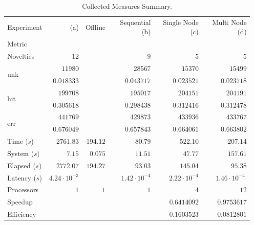 \begin{table}[hbt]
\begin{center}
  \caption{Collected Measures Summary.}
  \label{tab:exper-summary}
  \newcommand{\mr}[1]{\multirow{2}{*}{#1}}
  \setlength\extrarowheight{2pt}
  \begin{tabular}{l|r|r|r|r|r}
    Experiment      &  (a) & Offline       & Sequential (b)  & Single Node (c) & Multi Node (d)  \\
    Metric          &               &               &                 &                 &        \\\hline
    Novelties       & $12$          &               & $9$             & $5$             & $5$    \\\hline
    \mr{unk}        & $11980$       &               & $28567$         & $15370$         & $15499$     \\
                    & $0.018333$    &               & $0.043717$      & $0.023521$      & $0.023718$  \\\hline
    \mr{hit}        & $199708$      &               & $195017$        & $204151$        & $204191$    \\
                    & $0.305618$    &               & $0.298438$      & $0.312416$      & $0.312478$  \\\hline
    \mr{err}        & $441769$      &               & $429873$        & $433936$        & $433767$    \\
                    & $0.676049$    &               & $0.657843$      & $0.664061$      & $0.663802$  \\\hline
    Time      ($s$) & $2761.83$     & $194.12$      & $80.79$         & $522.10$        & $207.14$    \\\hline
    System    ($s$) & $7.15$        & $ 0.075$      & $11.51$         & $ 47.77$        & $157.61$    \\\hline
    Elapsed   ($s$) & $2772.07$     & $194.27$      & $93.03$         & $145.04$        & $ 95.38$    \\\hline
    Latency   ($s$) & $4.24\cdot10^{-3}$  &         & $1.42\cdot10^{-4}$  & $2.22\cdot10^{-4}$  & $1.46\cdot10^{-4}\ $  \\\hline
    Processors      & $1$           &  $1$          &  $1$            & $4$         & $12$        \\\hline
    Speedup         &               &               &                 & $0.6414092$ & $0.9753617$  \\\hline
    Efficiency      &               &               &                 & $0.1603523$ & $0.0812801$  
  \end{tabular}
\end{center}
\end{table}

